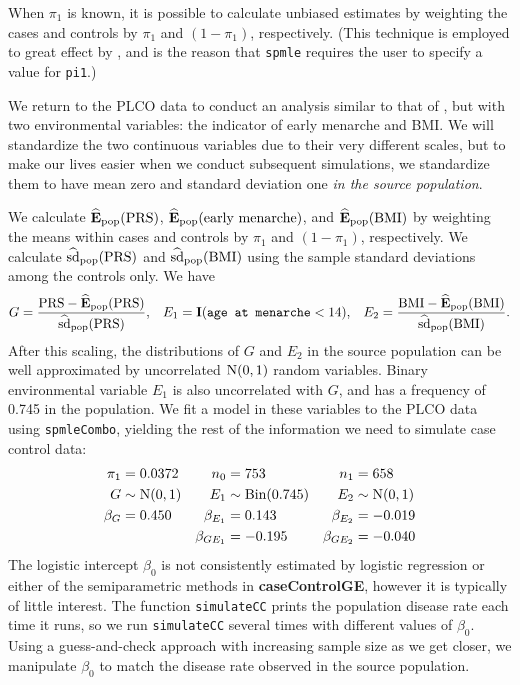 \documentclass{article}\usepackage[]{graphicx}\usepackage[]{color}
\def\code#1{\texttt{#1}}
\def\pkg#1{\textbf{#1}}
\begin{document}
When $\pi_1$ is known, it is possible to calculate unbiased estimates by weighting the cases and controls by $\pi_1$ and $(1 - \pi_1)$, respectively.  (This technique is employed to great effect by \citeauthor{Stalder2017}, and is the reason that \code{spmle} requires the user to specify a value for \code{pi1}.)

We return to the PLCO data to conduct an analysis similar to that of \citeauthor{Wang2018unpublished}, but with two environmental variables: the indicator of early menarche and BMI.  We will standardize the two continuous variables due to their very different scales, but to make our lives easier when we conduct subsequent simulations, we standardize them to have mean zero and standard deviation one \emph{in the source population}.

We calculate $\mathbf{\widehat{E}_{\rm pop}}(\rm PRS)$, $\mathbf{\widehat{E}_{\rm pop}}(\text{early menarche})$, and $\mathbf{\widehat{E}_{\rm pop}}(\rm BMI)$ by weighting the means within cases and controls by $\pi_1$ and $(1 - \pi_1)$, respectively.  We calculate $\widehat{\hbox{sd}}_{\rm pop}(\rm PRS)$ and $\widehat{\hbox{sd}}_{\rm pop}(\rm BMI)$ using the sample standard deviations among the controls only.  We have
\begin{align*}
  G = \frac{{\rm PRS} - \mathbf{\widehat{E}_{\rm pop}}(\rm PRS)}{\widehat{\hbox{sd}}_{\rm pop}(\rm PRS)}, && E_1 = \mathbf{I}(\texttt{age at menarche} < 14), && E_2 = \frac{{\rm BMI} - \mathbf{\widehat{E}_{\rm pop}}(\rm BMI)}{\widehat{\hbox{sd}}_{\rm pop}(\rm BMI)}.
\end{align*}
After this scaling, the distributions of $G$ and $E_2$ in the source population can be well approximated by uncorrelated $\hbox{N}(0, 1)$ random variables.  Binary environmental variable $E_1$ is also uncorrelated with $G$, and has a frequency of 0.745 in the population.  We fit a model in these variables to the PLCO data using \code{spmleCombo}, yielding the rest of the information we need to simulate case control data:
\begin{align*}
  \pi_1   & =    0.0372        & n_0          & =    753               & n_1          & =     658          \\
  G       & \sim \hbox{N}(0,1) & E_1          & \sim \hbox{Bin}(0.745) & E_2          & \sim \hbox{N}(0,1) \\
  \beta_G & =    0.450         & \beta_{E_1}  & =    0.143             & \beta_{E_2}  & =    -0.019        \\
          &                    & \beta_{GE_1} & =   -0.195             & \beta_{GE_2} & =    -0.040
\end{align*}
The logistic intercept $\beta_0$ is not consistently estimated by logistic regression or either of the semiparametric methods in \pkg{caseControlGE}, however it is typically of little interest.  The function \code{simulateCC} prints the population disease rate each time it runs, so we run \code{simulateCC} several times with different values of $\beta_0$.  Using a guess-and-check approach with increasing sample size as we get closer, we manipulate $\beta_0$ to match the disease rate observed in the source population.
\end{document}
